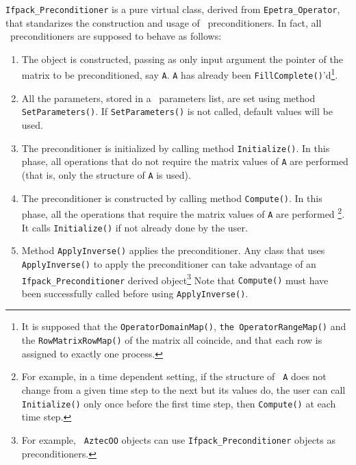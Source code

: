 \verb!Ifpack_Preconditioner! is a pure virtual class, derived from
\verb!Epetra_Operator!, that standarizes the construction and usage of \ifpack\
preconditioners. In fact, all \ifpack\ preconditioners are supposed to behave
as follows:
\begin{enumerate}
\item The object is constructed, passing as only input argument the
pointer of the matrix to be preconditioned, say {\tt A}. {\tt A} has already
been {\tt FillComplete()}'d\footnote{It is supposed that the {\tt OperatorDomainMap()}, {\tt the OperatorRangeMap()}
and
the {\tt RowMatrixRowMap()} of the matrix all coincide, and that each row is 
assigned
to exactly one process.}.
%
\item All the parameters, stored in a \teuchos\ parameters list, are
set using method \verb!SetParameters()!. If \verb!SetParameters()! is not
called, default values will be used.
%
\item The preconditioner is initialized by calling method \verb!Initialize()!.
In this phase, all operations that do not require the matrix values of {\tt A}
are performed (that is, only the structure of {\tt A} is used).
%
\item The preconditioner is constructed by calling method \verb!Compute()!.
In this phase, all the operations that require the matrix values of {\tt A}
are performed
\footnote{For example, in a time dependent setting, if the structure of {\tt
  A} does not change from a given time step to the next but its values do,
  the user can call {\tt Initialize()} only once before the first time step,
  then {\tt Compute()} at each time step.}. It calls {\tt Initialize()} if
  not already done by the user.
%
\item Method \verb!ApplyInverse()! applies the preconditioner. Any class that
uses \verb!ApplyInverse()! to apply the preconditioner can take advantage of
an \verb!Ifpack_Preconditioner! derived object\footnote{For example, {\tt
AztecOO} objects can use {\tt Ifpack\_Preconditioner} objects as
preconditioners.} Note that {\tt Compute()} must have been successfully called before
using \verb!ApplyInverse()!.


\end{enumerate}
